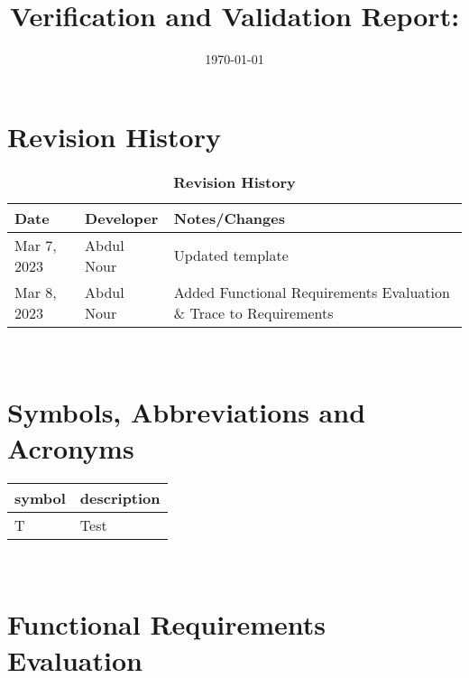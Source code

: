 \documentclass[12pt, titlepage]{article}
\begin{document}
\title{Verification and Validation Report: \progname} 
\author{\authname}
\date{\today}
	
\maketitle


\section{Revision History}

\begin{table}[H]
  \caption{\bf Revision History}
  \begin{tabularx}{\textwidth}{p{2.5cm}p{2.5cm}X}
  \toprule {\bf Date} & {\bf Developer} & {\bf Notes/Changes}\\
  \midrule
  Mar 7, 2023 & Abdul Nour & Updated template\\
  Mar 8, 2023 & Abdul Nour & Added Functional Requirements Evaluation \& Trace to Requirements\\
  \bottomrule
  \end{tabularx}
  \end{table}

~\newpage

\section{Symbols, Abbreviations and Acronyms}

\renewcommand{\arraystretch}{1.2}
\begin{tabular}{l l} 
  \toprule		
  \textbf{symbol} & \textbf{description}\\
  \midrule 
  T & Test\\
  \bottomrule
\end{tabular}\\


\newpage

\tableofcontents

\listoftables %

\listoffigures %

\newpage



\section{Functional Requirements Evaluation}
\end{document}
